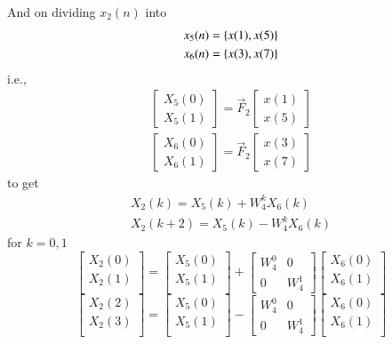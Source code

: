 \documentclass[journal,12pt,twocolumn]{IEEEtran}
\newcommand{\mymat}[1]{\ensuremath{\begin{bmatrix}#1\end{bmatrix}}}
\renewcommand\thesection{\arabic{section}}
\begin{document}
\begin{enumerate}[label=\thesection.\arabic*]
And on dividing $x_2(n)$ into
\begin{align}
	x_5(n) = \left\{x(1), x(5)\right\} \\
	x_6(n) = \left\{x(3), x(7)\right\}
\end{align}
i.e.,
\begin{align}
	\mymat{X_5(0) \\ X_5(1)} = \vec{F}_2 \mymat{x(1) \\ x(5)} \\
	\mymat{X_6(0) \\ X_6(1)} = \vec{F}_2 \mymat{x(3) \\ x(7)}
\end{align}
to get
\begin{align}
	X_2(k) = X_5(k) + W_4^k X_6(k) \\
	X_2(k + 2) = X_5(k) - W_4^k X_6(k) 
\end{align}
for $k = 0, 1$
\begin{equation}
\begin{bmatrix}
X_{2}(0) \\ 
X_{2}(1)\\ 
\end{bmatrix}
=
\begin{bmatrix}
X_{5}(0) \\ 
X_{5}(1)\\ 
\end{bmatrix}
+
\begin{bmatrix}
W^{0}_{4} & 0\\
0 & W^{1}_{4}
\end{bmatrix}
\begin{bmatrix}
X_{6}(0) \\ 
X_{6}(1) \\ 
\end{bmatrix}
\end{equation}
\begin{equation}
\begin{bmatrix}
X_{2}(2) \\ 
X_{2}(3)\\ 
\end{bmatrix}
=
\begin{bmatrix}
X_{5}(0) \\ 
X_{5}(1)\\ 
\end{bmatrix}
-
\begin{bmatrix}
W^{0}_{4} & 0\\
0 & W^{1}_{4}
\end{bmatrix}
\begin{bmatrix}
X_{6}(0) \\ 
X_{6}(1) \\ 
\end{bmatrix}
\end{equation}


\end{enumerate}
\end{document}
